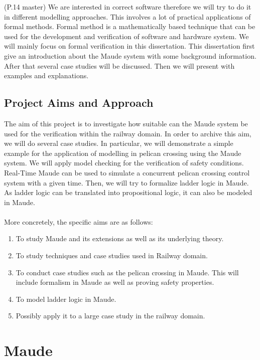 \documentclass{report}
\begin{document}
 (P.14 master)\newline \newline
We are interested in correct software therefore we will try to do it in different modelling approaches. This involves a lot of practical applications of formal methods. Formal method is a mathematically based technique that can be used for the development and verification of software and hardware system. We will mainly focus on formal verification in this dissertation. This dissertation first give an introduction about the Maude system with some background information. After that several case studies will be discussed. Then we will present with examples and explanations. 

\section{Project Aims and Approach}
The aim of this project is to investigate how suitable can the Maude system be used for the verification within the railway domain. In order to archive this aim, we will do several case studies. In particular, we will demonstrate a simple example for the application of modelling in pelican crossing using the Maude system. We will apply model checking for the verification of safety conditions. Real-Time Maude can be used to simulate a concurrent pelican crossing control system with a given time. Then, we will try to formalize ladder logic in Maude. As ladder logic can be translated into propositional logic, it can also be modeled in Maude. \\\\
More concretely, the specific aims are as follows:
\begin{enumerate}
\item To study Maude and its extensions as well as its underlying theory.
\item To study techniques and case studies used in Railway domain.
\item To conduct case studies such as the pelican crossing in Maude. This will include formalism in Maude as well as proving safety properties.
\item To model ladder logic in Maude.
\item Possibly apply it to a large case study in the railway domain.
\end{enumerate}


\newpage
\chapter{Maude}
\end{document}
